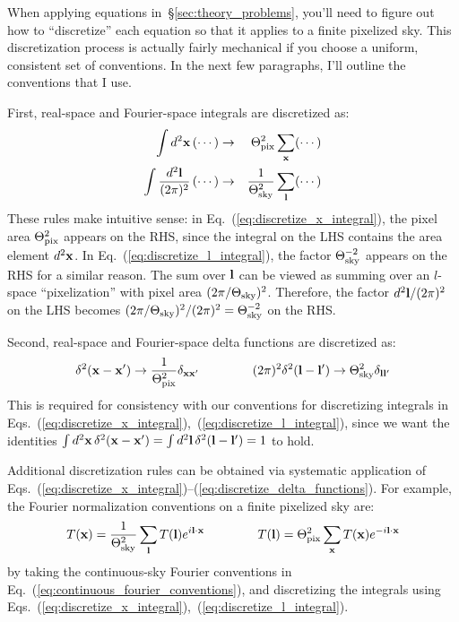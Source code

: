 \documentclass[aps,prd,superscriptaddress,groupedaddress,nofootinbib,nobibnotes]{revtex4}
\newcommand{\be}{\begin{equation}}
\newcommand{\ee}{\end{equation}}
\newcommand{\ba}{\begin{eqnarray}}
\newcommand{\ea}{\end{eqnarray}}
\def\x{{\bf x}}
\def\l{{\bf l}}
\begin{document}
When applying equations in~\S\ref{sec:theory_problems}, you'll need to figure out how to ``discretize'' each equation
so that it applies to a finite pixelized sky.  This discretization process is actually fairly mechanical if you choose
a uniform, consistent set of conventions.  In the next few paragraphs, I'll outline the conventions that I use.

First, real-space and Fourier-space integrals are discretized as:
\ba
\int d^2\x \, (\cdots) & \rightarrow & \Theta_{\rm pix}^2 \sum_{\x} (\cdots)  \label{eq:discretize_x_integral}  \\
\int \frac{d^2\l}{(2\pi)^2}  \, (\cdots) & \rightarrow & \frac{1}{\Theta_{\rm sky}^2} \sum_{\l} (\cdots)  \label{eq:discretize_l_integral}
\ea
These rules make intuitive sense: in Eq.~(\ref{eq:discretize_x_integral}), the pixel area $\Theta_{\rm pix}^2$ appears on
the RHS, since the integral on the LHS contains the area element $d^2\x$.
In Eq.~(\ref{eq:discretize_l_integral}), the factor $\Theta_{\rm sky}^{-2}$ appears on the RHS for a similar reason.
The sum over $\l$ can be viewed as summing over an $l$-space ``pixelization'' with pixel area $(2\pi/\Theta_{\rm sky})^2$.
Therefore, the factor $d^2\l/(2\pi)^2$ on the LHS becomes $(2\pi/\Theta_{\rm sky})^2 / (2\pi)^2 = \Theta_{\rm sky}^{-2}$
on the RHS.

Second, real-space and Fourier-space delta functions are discretized as:
\be
\delta^2(\x-\x') \rightarrow \frac{1}{\Theta_{\rm pix}^2} \delta_{\x\x'}
\hspace{1.5cm}
(2\pi)^2 \delta^2(\l-\l') \rightarrow \Theta_{\rm sky}^2 \delta_{\l\l'}  \label{eq:discretize_delta_functions}
\ee
This is required for consistency with our conventions for discretizing integrals in
Eqs.~(\ref{eq:discretize_x_integral}),~(\ref{eq:discretize_l_integral}), since we want the
identities $\int d^2\x \, \delta^2(\x-\x') = \int d^2\l \, \delta^2(\l-\l') = 1$ to hold.

Additional discretization rules can be obtained via systematic application of
Eqs.~(\ref{eq:discretize_x_integral})--(\ref{eq:discretize_delta_functions}).
For example, the Fourier normalization conventions on a finite pixelized sky are:
\be
T(\x) = \frac{1}{\Theta_{\rm sky}^2} \sum_{\l} T(\l) e^{i\l\cdot\x}
\hspace{1.5cm}
T(\l) = \Theta_{\rm pix}^2 \sum_\x T(\x) e^{-i\l\cdot\x}  \label{eq:discrete_fourier_conventions}
\ee
by taking the continuous-sky Fourier conventions in Eq.~(\ref{eq:continuous_fourier_conventions}),
and discretizing the integrals using Eqs.~(\ref{eq:discretize_x_integral}),~(\ref{eq:discretize_l_integral}).
\end{document}
